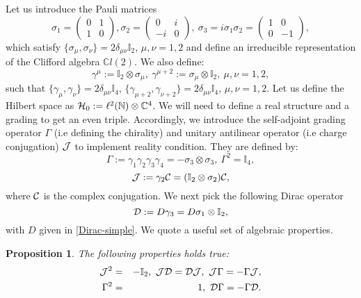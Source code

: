\documentclass[a4paper,11pt,twoside]{article}
\numberwithin{equation}{section}
\newcommand\bbone{{ \mathbb{I}}}
\newtheorem{proposition}[Theorem]{Proposition}
\theoremstyle{nonumberplain}
\begin{document}
Let us introduce the Pauli matrices
\begin{equation}
\sigma_1=\begin{pmatrix}
0&1\\ 
1&0
\end{pmatrix}, \sigma_2=\begin{pmatrix}
0&i\\ 
-i&0
\end{pmatrix},\ \sigma_3=i\sigma_1\sigma_2=\begin{pmatrix}
1&0\\
0&-1\end{pmatrix},
\end{equation}
which satisfy $\{\sigma_\mu,\sigma_\nu\}=2\delta_{\mu\nu}\bbone_2$, $\mu,\nu=1,2$ and define an irreducible representation of the Clifford algebra $\mathbb{C}l(2)$. We also define:
\begin{equation}
\gamma^\mu:=\bbone_2\otimes\sigma_\mu,\ \gamma^{\mu+2}:=\sigma_\mu\otimes\bbone_2,\ \mu,\nu=1,2,\label{ko-clifford}
\end{equation}
such that $\{\gamma_\mu,\gamma_\nu \}=2\delta_{\mu\nu}\bbone_4$, $\{\gamma_{\mu+2},\gamma_{\nu+2} \}=2\delta_{\mu\nu}\bbone_4$, $\mu,\nu=1,2$. Let us define the Hilbert space as ${\cal{H}}_0:=\ell^2(\mathbb{N})\otimes\mathbb{C}^4$. We will need to define a real structure and a grading to get an even triple. Accordingly, we introduce the self-adjoint grading operator $\Gamma$ (i.e defining the chirality) and unitary antilinear operator (i.e charge conjugation) ${\cal{J}}$ to implement reality condition. They are defined by:
\begin{equation}
\Gamma:=\gamma_1\gamma_2\gamma_3\gamma_4=-\sigma_3\otimes\sigma_3,\ \Gamma^2=\bbone_4\label{chiral},
\end{equation}
\begin{equation}
{\cal{J}}:=\gamma_2{\cal{C}}=(\bbone_2\otimes\sigma_2){\cal{C}},
\end{equation}
where ${\cal{C}}$ is the complex conjugation. We next pick the following Dirac operator
\begin{equation}
{\cal{D}}:=D\gamma_3=D\sigma_1\otimes\bbone_2,
\end{equation}
with $D$ given in \eqref{Dirac-simple}. We quote a useful set of algebraic properties.
\begin{proposition}\label{KO-real}
The following properties holds true:
\begin{eqnarray}
{\cal{J}}^2&=&-\bbone_2,\ {\cal{J}}{\cal{D}}={\cal{D}}{\cal{J}},\ {\cal{J}}\Gamma=-\Gamma{\cal{J}},\label{KO-dim}\\ 
\Gamma^2&=&1,\ {\cal{D}}\Gamma=-\Gamma{\cal{D}}\label{real-struct-grad}.
\end{eqnarray}
\end{proposition}
\end{document}
